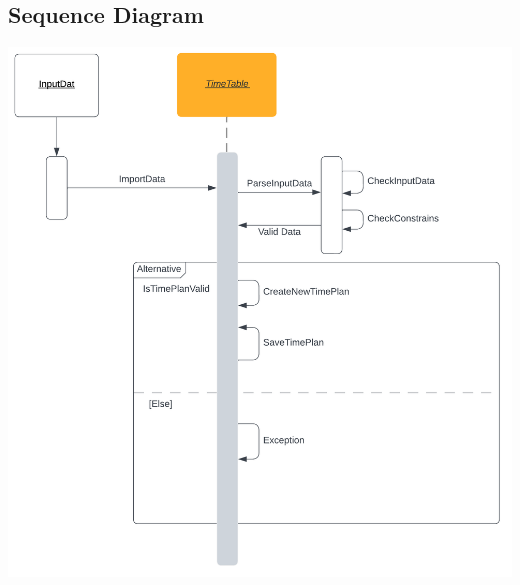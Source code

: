 \documentclass{scrreprt}
\begin{document}
	\subsection{Sequence Diagram}
	\includegraphics{Sequence diagram NO DB}
	
	
\end{document}
